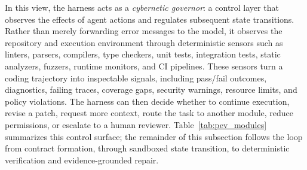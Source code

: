 In this view, the harness acts as a \emph{cybernetic governor}: a control layer that observes the effects of agent actions and regulates subsequent state transitions. Rather than merely forwarding error messages to the model, it observes the repository and execution environment through deterministic sensors such as linters, parsers, compilers, type checkers, unit tests, integration tests, static analyzers, fuzzers, runtime monitors, and CI pipelines. These sensors turn a coding trajectory into inspectable signals, including pass/fail outcomes, diagnostics, failing traces, coverage gaps, security warnings, resource limits, and policy violations. The harness can then decide whether to continue execution, revise a patch, request more context, route the task to another module, reduce permissions, or escalate to a human reviewer. Table~\ref{tab:pev_modules} summarizes this control surface; the remainder of this subsection follows the loop from contract formation, through sandboxed state transition, to deterministic verification and evidence-grounded repair.


